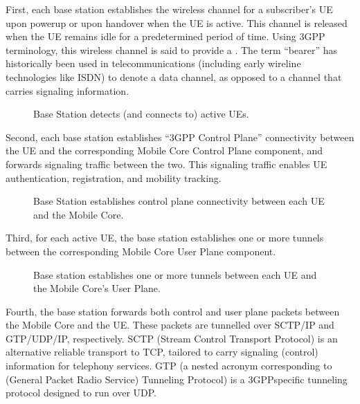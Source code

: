 \documentclass[a4paper,11pt,english]{sphinxmanual}
\let\sphinxpxdimen\pdfpxdimen\else\newdimen\sphinxpxdimen
\begin{document}
\sphinxAtStartPar
First, each base station establishes the wireless channel for a
subscriber’s UE upon power\sphinxhyphen{}up or upon handover when the UE is active.
This channel is released when the UE remains idle for a predetermined
period of time. Using 3GPP terminology, this wireless channel is said to
provide a . The term “bearer” has historically been used in
telecommunications (including early wireline technologies like
ISDN) to denote a data channel, as opposed to a channel that
carries signaling information.

\begin{figure}[ht]
\centering
\capstart

\noindent\sphinxincludegraphics[width=500\sphinxpxdimen]{{Slide03}.png}
\caption{Base Station detects (and connects to) active UEs.}\label{\detokenize{arch:id4}}\label{\detokenize{arch:fig-active-ue}}\end{figure}

\sphinxAtStartPar
Second, each base station establishes “3GPP Control Plane”
connectivity between the UE and the corresponding Mobile Core Control
Plane component, and forwards signaling traffic between the two. This
signaling traffic enables UE authentication, registration, and
mobility tracking.

\begin{figure}[ht]
\centering
\capstart

\noindent\sphinxincludegraphics[width=500\sphinxpxdimen]{{Slide04}.png}
\caption{Base Station establishes control plane connectivity
between each UE and the Mobile Core.}\label{\detokenize{arch:id5}}\label{\detokenize{arch:fig-control-plane}}\end{figure}

\sphinxAtStartPar
Third, for each active UE, the base station establishes one or more
tunnels between the corresponding Mobile Core User Plane component.

\begin{figure}[ht]
\centering
\capstart

\noindent\sphinxincludegraphics[width=500\sphinxpxdimen]{{Slide05}.png}
\caption{Base station establishes one or more tunnels between
each UE and the Mobile Core’s User Plane.}\label{\detokenize{arch:id6}}\label{\detokenize{arch:fig-user-plane}}\end{figure}

\sphinxAtStartPar
Fourth, the base station forwards both control and user plane packets
between the Mobile Core and the UE. These packets are tunnelled over
SCTP/IP and GTP/UDP/IP, respectively. SCTP (Stream Control Transport
Protocol) is an alternative reliable transport to TCP, tailored to carry
signaling (control) information for telephony services. GTP (a nested
acronym corresponding to (General Packet Radio Service) Tunneling
Protocol) is a 3GPP\sphinxhyphen{}specific tunneling protocol designed to run over
UDP.
\end{document}
